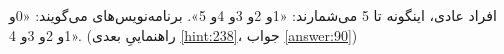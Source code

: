 \section{}
\paragraph{}\label{hint:253}
افراد عادی، اینگونه تا 5 می‌شمارند: «1و 2و 3و 4و 5». برنامه‌نویس‌های  می‌گویند: «0و 1و 2و 3و 4». (راهنماییِ بعدی \ref{hint:238}، جواب \ref{answer:90})